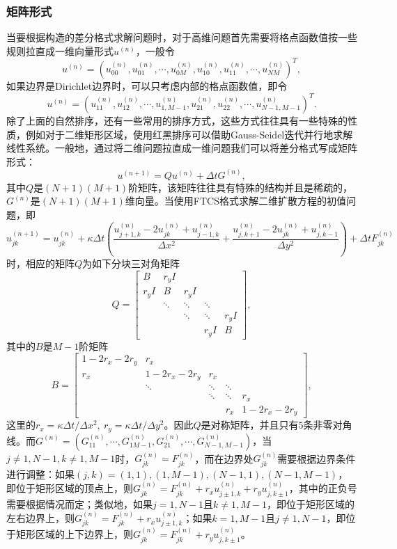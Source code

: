 \documentclass[a4paper,10pt]{ctexart}
\begin{document}
\subsubsection{矩阵形式}
当要根据构造的差分格式求解问题时，对于高维问题首先需要将格点函数值按一些规则拉直成一维向量形式$ u^{(n)} $，一般令
\[
    u^{(n)} = (u^{(n)}_{00},u^{(n)}_{01},\cdots ,u^{(n)}_{0M},u^{(n)}_{10},u^{(n)}_{11},\cdots ,u^{(n)}_{NM})^T,
\]
如果边界是Dirichlet边界时，可以只考虑内部的格点函数值，即令
\[
    u^{(n)} = (u^{(n)}_{11},u^{(n)}_{12},\cdots ,u^{(n)}_{1,M-1},u^{(n)}_{21},u^{(n)}_{22},\cdots ,u^{(n)}_{N-1,M-1})^T.
\]
除了上面的自然排序，还有一些常用的排序方式，这些方式往往具有一些特殊的性质，例如对于二维矩形区域，使用红黑排序可以借助Gauss-Seidel迭代并行地求解线性系统。一般地，通过将二维问题拉直成一维问题我们可以将差分格式写成矩阵形式：
\[
    u^{(n+1)} = Q u^{(n)} + \Delta t G^{(n)},
\]
其中$ Q $是$ (N+1)(M+1) $阶矩阵，该矩阵往往具有特殊的结构并且是稀疏的，$ G^{(n)} $是$ (N+1)(M+1) $维向量。当使用FTCS格式求解二维扩散方程的初值问题，即
\[
    u^{(n+1)}_{jk} = u^{(n)}_{jk} + \kappa \Delta t \left( \frac{u^{(n)}_{j+1,k}-2u^{(n)}_{jk}+u^{(n)}_{j-1,k}}{\Delta x^2} + \frac{u^{(n)}_{j,k+1}-2u^{(n)}_{jk}+u^{(n)}_{j,k-1}}{\Delta y^2} \right) + \Delta t F_{jk}^{(n)}
\]
时，相应的矩阵$ Q $为如下分块三对角矩阵
\[
    Q = 
    \begin{bmatrix} 
        B & r_y I & & & \\
        r_y I & B & r_y I & &\\
        & \ddots & \ddots & \ddots &\\
        & & \ddots & \ddots & r_yI \\
        & & & r_y I & B
    \end{bmatrix},
\]
其中的$ B $是$ M-1 $阶矩阵
\[
    B = 
    \begin{bmatrix} 
        1-2r_x - 2r_y & r_x & & & \\
        r_x & 1-2r_x - 2r_y & r_x & &\\
        & \ddots & \ddots & \ddots &\\
        & & \ddots & \ddots & r_x \\
        & & & r_x & 1-2r_x - 2r_y
    \end{bmatrix},
\]
这里的$ r_x = \kappa \Delta t / \Delta x^2,\ r_y = \kappa \Delta t / \Delta y^2 $。因此$ Q $是对称矩阵，并且只有$ 5 $条非零对角线。而$ G^{(n)} = (G^{(n)}_{11},\cdots ,G^{(n)}_{1M-1},G^{(n)}_{21},\cdots ,G^{(n)}_{N-1,M-1}) $，当$ j\ne 1,N-1,k\ne 1,M-1 $时，$ G^{(n)}_{jk} = F^{(n)}_{jk} $，而在边界处$ G^{(n)}_{jk} $需要根据边界条件进行调整：如果$ (j,k) = (1,1),(1,M-1),(N-1,1),(N-1,M-1) $，即位于矩形区域的顶点上，则$ G^{(n)}_{jk} = F^{(n)}_{jk} + r_x u^{(n)}_{j\pm 1, k} + r_y u^{(n)}_{j,k\pm 1} $，其中的正负号需要根据情况而定；类似地，如果$ j = 1,N-1 $且$ k\ne 1,M-1 $，即位于矩形区域的左右边界上，则$ G^{(n)}_{jk} = F^{(n)}_{jk} + r_x u^{(n)}_{j\pm 1, k} $；如果$ k = 1,M-1 $且$ j\ne 1,N-1 $，即位于矩形区域的上下边界上，则$ G^{(n)}_{jk} = F^{(n)}_{jk} + r_y u^{(n)}_{j,k\pm 1} $。
\end{document}
